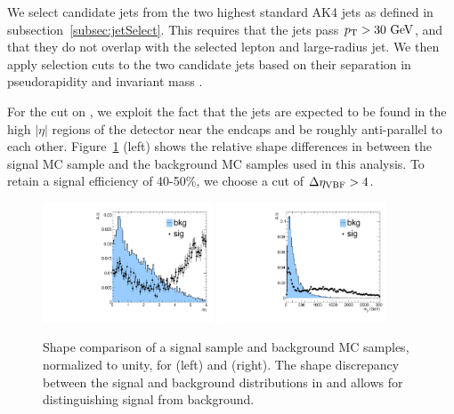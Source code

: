 We select candidate \VBF jets from the two highest \pt standard AK4 jets as defined in subsection~\ref{subsec:jetSelect}.
This requires that the \VBF jets pass $\pt>30\unit{GeV}$, and that they do not overlap with the selected lepton and large-radius jet.
We then apply selection cuts to the two candidate \VBF jets based on their separation in pseudorapidity \DetaVBF and \VBF invariant mass \mjjVBF.

For the cut on \DetaVBF, we exploit the fact that the \VBF jets are expected to be found in the high $|\eta|$ regions of the detector near the endcaps and be roughly anti-parallel to each other.
Figure~\ref{fig:detaSB_VBF} (left) shows the relative shape differences in \DetaVBF between the \VBF\RadtoWW signal MC sample and the background MC samples used in this analysis.
To retain a signal efficiency of 40-50\%, we choose a cut of $\DetaVBF>4$.

\begin{figure}[htbp]
  \centering
  \includegraphics[width=0.45\textwidth]{fig/eventSelection/detaSB.pdf}
  \includegraphics[width=0.45\textwidth]{fig/eventSelection/mjjSB.pdf}
  \caption{
    Shape comparison of a \VBF\RadtoWW signal sample and background MC samples, normalized to unity, for \DetaVBF (left) and \mjjVBF (right).
    The shape discrepancy between the \VBF signal and background distributions in \DetaVBF and \mjjVBF allows for distinguishing signal from background.
  }
  \label{fig:detaSB_VBF}
\end{figure}

